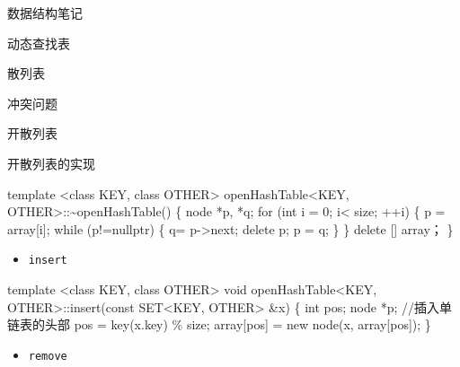 \documentclass[
  ignorenonframetext,
]{beamer}
\newenvironment{Shaded}{}{}
\newcommand{\NormalTok}[1]{#1}
\providecommand{\tightlist}{%
  \setlength{\itemsep}{0pt}\setlength{\parskip}{0pt}}
\begin{document}
\begin{frame}[fragile]{数据结构笔记}
\begin{block}{动态查找表}
\begin{block}{散列表}
\begin{block}{冲突问题}
\begin{block}{开散列表}
\begin{block}{开散列表的实现}
\begin{Shaded}
\begin{Highlighting}[]
\NormalTok{template \textless{}class KEY, class OTHER\textgreater{}}
\NormalTok{openHashTable\textless{}KEY, OTHER\textgreater{}::\textasciitilde{}openHashTable()}
\NormalTok{\{}
\NormalTok{  node *p, *q;}
\NormalTok{  for (int i = 0; i\textless{} size; ++i)}
\NormalTok{  \{ }
\NormalTok{    p = array[i];}
\NormalTok{    while (p!=nullptr)}
\NormalTok{    \{ }
\NormalTok{      q= p{-}\textgreater{}next; delete p; p = q;}
\NormalTok{    \}}
\NormalTok{  \}}
\NormalTok{  delete [] array；}
\NormalTok{\}}
\end{Highlighting}
\end{Shaded}

\begin{itemize}
\tightlist
\item
  \texttt{insert}
\end{itemize}

\begin{Shaded}
\begin{Highlighting}[]
\NormalTok{template \textless{}class KEY, class OTHER\textgreater{}}
\NormalTok{void openHashTable\textless{}KEY, OTHER\textgreater{}::insert(const SET\textless{}KEY, OTHER\textgreater{} \&x)}
\NormalTok{\{}
\NormalTok{  int pos;}
\NormalTok{  node *p;}
\NormalTok{  //插入单链表的头部}
\NormalTok{  pos = key(x.key) \% size;}
\NormalTok{  array[pos] = new node(x, array[pos]);}
\NormalTok{\}}
\end{Highlighting}
\end{Shaded}

\begin{itemize}
\tightlist
\item
  \texttt{remove}
\end{itemize}


\end{block}
\end{block}
\end{block}
\end{block}
\end{block}
\end{frame}
\end{document}
